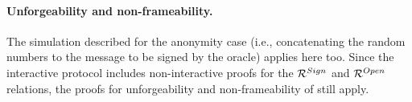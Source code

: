 \paragraph{Unforgeability and non-frameability.} The simulation described for
the anonymity case (i.e., \advB concatenating the random numbers
to the message to be signed by the oracle) applies here too. Since the
interactive protocol includes non-interactive proofs for the $\mathcal{R}^{Sign}$
and $\mathcal{R}^{Open}$ relations, the proofs for unforgeability and
non-frameability of \CUASGen still apply.


